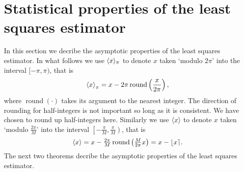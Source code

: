 \documentclass[journal]{IEEEtran}
\begin{document}


\section{Statistical properties of the least squares estimator}\label{sec:stat-prop-least}

In this section we decribe the asymptotic properties of the least squares estimator.  In what follows we use $\langle x \rangle_\pi$ to denote $x$ taken `modulo $2\pi$' into the interval $[-\pi, \pi)$, that is
\[
\left\langle x \right\rangle_\pi = x - 2\pi\operatorname{round}\left(\frac{x}{2\pi}\right),
\]
where $\operatorname{round}(\cdot)$ takes its argument to the nearest integer.  The direction of rounding for half-integers is not important so long as it is consistent.  We have chosen to round up half-integers here.  Similarly we use $\langle x \rangle$ to denote $x$ taken `modulo $\tfrac{2\pi}{M}$' into the interval $\left[-\tfrac{\pi}{M}, \tfrac{\pi}{M}\right)$, that is
\[
\left\langle x \right\rangle = x - \tfrac{2\pi}{M}\operatorname{round}\left(\tfrac{M}{2\pi}x\right) = x - {\left\lfloor x \right\rceil}.
\]
The next two theorems decribe the asymptotic properties of the least squares estimator.
\end{document}
